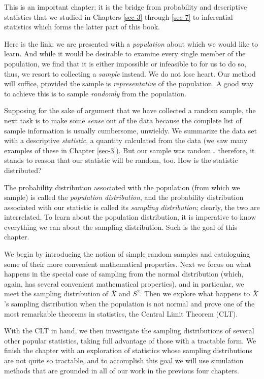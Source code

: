 \documentclass[captions=tableheading]{scrbook}
\begin{document}
\noindent 
This is an important chapter; it is the bridge from probability and descriptive statistics that we studied in Chapters \ref{sec-3} through \ref{sec-7} to inferential statistics which forms the latter part of this book.

Here is the link: we are presented with a \emph{population} about which we would like to learn. And while it would be desirable to examine every single member of the population, we find that it is either impossible or infeasible to for us to do so, thus, we resort to collecting a \emph{sample} instead. We do not lose heart. Our method will suffice, provided the sample is \emph{representative} of the population. A good way to achieve this is to sample \emph{randomly} from the population.

Supposing for the sake of argument that we have collected a random sample, the next task is to make some \emph{sense} out of the data because the complete list of sample information is usually cumbersome, unwieldy. We summarize the data set with a descriptive \emph{statistic}, a quantity calculated from the data (we saw many examples of these in Chapter \ref{sec-3}). But our sample was random\ldots{} therefore, it stands to reason that our statistic will be random, too. How is the statistic distributed?

The probability distribution associated with the population (from which we sample) is called the \emph{population distribution}, and the probability distribution associated with our statistic is called its \emph{sampling distribution}; clearly, the two are interrelated. To learn about the population distribution, it is imperative to know everything we can about the sampling distribution. Such is the goal of this chapter.

We begin by introducing the notion of simple random samples and cataloguing some of their more convenient mathematical properties. Next we focus on what happens in the special case of sampling from the normal distribution (which, again, has several convenient mathematical properties), and in particular, we meet the sampling distribution of \(\overline{X}\) and \(S^{2}\). Then we explore what happens to \(\overline{X}\)'s sampling distribution when the population is not normal and prove one of the most remarkable theorems in statistics, the Central Limit Theorem (CLT).

With the CLT in hand, we then investigate the sampling distributions of several other popular statistics, taking full advantage of those with a tractable form. We finish the chapter with an exploration of statistics whose sampling distributions are not quite so tractable, and to accomplish this goal we will use simulation methods that are grounded in all of our work in the previous four chapters.
\end{document}
